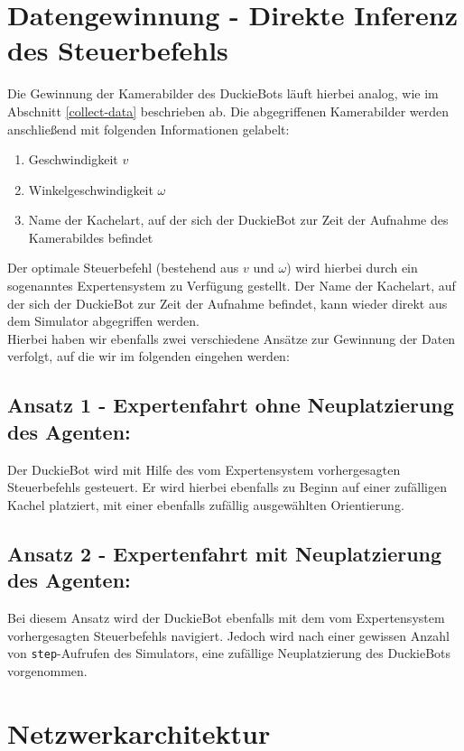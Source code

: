 \section{Datengewinnung - Direkte Inferenz des Steuerbefehls}

Die Gewinnung der Kamerabilder des DuckieBots läuft hierbei analog, wie im Abschnitt \ref{collect-data} beschrieben ab. Die abgegriffenen Kamerabilder werden anschließend mit folgenden Informationen gelabelt:

\begin{enumerate}
	\item Geschwindigkeit $v$
	\item Winkelgeschwindigkeit $\omega$
	\item Name der Kachelart, auf der sich der DuckieBot zur Zeit der Aufnahme des Kamerabildes befindet
\end{enumerate}


Der optimale Steuerbefehl (bestehend aus $v$ und $\omega$) wird hierbei durch ein sogenanntes Expertensystem zu Verfügung gestellt. Der Name der Kachelart, auf der sich der DuckieBot zur Zeit der Aufnahme befindet, kann wieder direkt aus dem Simulator abgegriffen werden. \\

Hierbei haben wir ebenfalls zwei verschiedene Ansätze zur Gewinnung der Daten verfolgt, auf die wir im folgenden eingehen werden:

\subsection{Ansatz 1 - Expertenfahrt ohne Neuplatzierung des Agenten:}

Der DuckieBot wird mit Hilfe des vom Expertensystem vorhergesagten Steuerbefehls gesteuert. Er wird hierbei ebenfalls zu Beginn auf einer zufälligen Kachel platziert, mit einer ebenfalls zufällig ausgewählten Orientierung.

\subsection{Ansatz 2 - Expertenfahrt mit Neuplatzierung des Agenten:}

Bei diesem Ansatz wird der DuckieBot ebenfalls mit dem vom Expertensystem vorhergesagten Steuerbefehls navigiert. Jedoch wird nach einer gewissen Anzahl von \texttt{step}-Aufrufen des Simulators, eine zufällige Neuplatzierung des DuckieBots vorgenommen.


\section{Netzwerkarchitektur}

